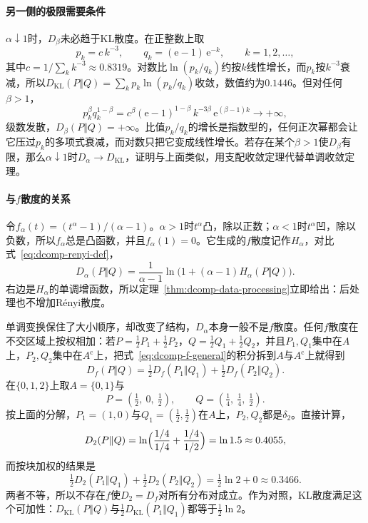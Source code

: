 \paragraph{另一侧的极限需要条件}
$\alpha\downarrow1$时，$D_{\beta}$未必趋于KL散度。在正整数上取
\[
 p_k=c\,k^{-3},\qquad q_k=(\mathrm{e}-1)\,\mathrm{e}^{-k},\qquad k=1,2,\dots,
\]
其中$c=1/\sum_kk^{-3}\approx0.8319$。对数比$\ln(p_k/q_k)$约按$k$线性增长，而$p_k$按$k^{-3}$衰减，所以$D_{\mathrm{KL}}(P\Vert Q)=\sum_kp_k\ln(p_k/q_k)$收敛，数值约为$0.1446$。但对任何$\beta>1$，
\[
 p_k^{\beta}q_k^{1-\beta}=c^{\beta}(\mathrm{e}-1)^{1-\beta}\,k^{-3\beta}\,\mathrm{e}^{(\beta-1)k}\to+\infty,
\]
级数发散，$D_{\beta}(P\Vert Q)=+\infty$。比值$p_k/q_k$的增长是指数型的，任何正次幂都会让它压过$p_k$的多项式衰减，而对数只把它变成线性增长。若存在某个$\beta>1$使$D_{\beta}$有限，那么$\alpha\downarrow1$时$D_{\alpha}\to D_{\mathrm{KL}}$，证明与上面类似，用支配收敛定理代替单调收敛定理。

\paragraph{与$f$散度的关系}
令$f_{\alpha}(t)=(t^{\alpha}-1)/(\alpha-1)$。$\alpha>1$时$t^{\alpha}$凸，除以正数；$\alpha<1$时$t^{\alpha}$凹，除以负数，所以$f_{\alpha}$总是凸函数，并且$f_{\alpha}(1)=0$。它生成的$f$散度记作$H_{\alpha}$，对比式~\eqref{eq:dcomp-renyi-def}，
\[
 D_{\alpha}(P\Vert Q)=\frac{1}{\alpha-1}\ln\bigl(1+(\alpha-1)H_{\alpha}(P\Vert Q)\bigr) .
\]
右边是$H_{\alpha}$的单调增函数，所以定理~\ref{thm:dcomp-data-processing}立即给出：后处理也不增加Rényi散度。

单调变换保住了大小顺序，却改变了结构，$D_{\alpha}$本身一般不是$f$散度。任何$f$散度在不交区域上按权相加：若$P=\tfrac12P_1+\tfrac12P_2$，$Q=\tfrac12Q_1+\tfrac12Q_2$，并且$P_1,Q_1$集中在$A$上，$P_2,Q_2$集中在$A^{\mathrm{c}}$上，把式~\eqref{eq:dcomp-f-general}的积分拆到$A$与$A^{\mathrm{c}}$上就得到
\[
 D_f(P\Vert Q)=\tfrac12D_f(P_1\Vert Q_1)+\tfrac12D_f(P_2\Vert Q_2) .
\]
在$\{0,1,2\}$上取$A=\{0,1\}$与
\[
 P=(\tfrac12,\ 0,\ \tfrac12),\qquad Q=(\tfrac14,\ \tfrac14,\ \tfrac12) .
\]
按上面的分解，$P_1=(1,0)$与$Q_1=(\tfrac12,\tfrac12)$在$A$上，$P_2,Q_2$都是$\delta_2$。直接计算，
\[
 D_2(P\Vert Q)=\ln\Bigl(\frac{1/4}{1/4}+\frac{1/4}{1/2}\Bigr)=\ln1.5\approx0.4055,
\]
而按块加权的结果是
\[
 \tfrac12D_2(P_1\Vert Q_1)+\tfrac12D_2(P_2\Vert Q_2)=\tfrac12\ln2+0\approx0.3466 .
\]
两者不等，所以不存在$f$使$D_2=D_f$对所有分布对成立。作为对照，KL散度满足这个可加性：$D_{\mathrm{KL}}(P\Vert Q)$与$\tfrac12D_{\mathrm{KL}}(P_1\Vert Q_1)$都等于$\tfrac12\ln2$。
